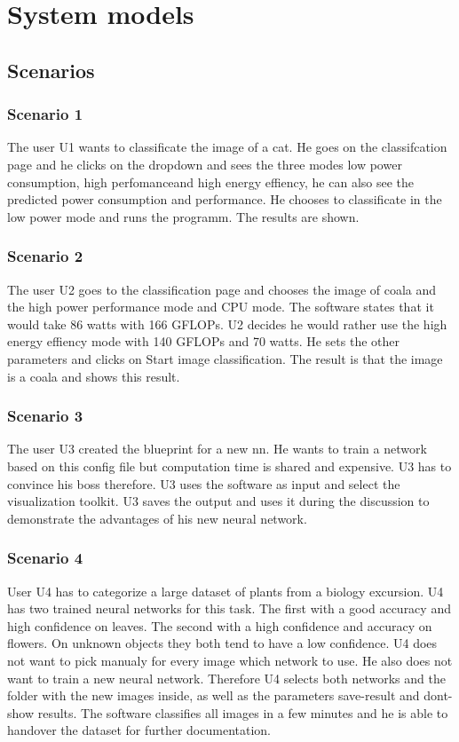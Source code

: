 \documentclass[parskip=full]{scrartcl}
\begin{document}
\section{System models}
\subsection{Scenarios}
\subsubsection{Scenario 1}
The user U1 wants to classificate the image of a cat. He goes on the classifcation page and he clicks on the dropdown and sees the three modes \glqq low power consumption\grqq , \glqq high perfomance\grqq and \glqq high energy effiency\grqq , he can also see the predicted power consumption and performance. He chooses to classificate in the low power mode and runs the programm. The results are shown.
\subsubsection{Scenario 2}
The user U2 goes to the classification page and chooses the image of coala and the high power performance mode and CPU mode. The software states that it would take 86 watts with 166 GFLOPs. U2 decides he would rather use the high energy effiency mode with 140 GFLOPs and 70 watts. He sets the other parameters and clicks on Start image classification. The result is that the image is a coala and shows this result. 
\subsubsection{Scenario 3}
The user U3 created the blueprint for a new nn.
He wants to train a network based on this config file but computation time is shared and expensive. U3 has to convince his boss therefore.
U3 uses the software as input and select the visualization toolkit.
U3 saves the output and uses it during the discussion to demonstrate the advantages of his new neural network.
\clearpage
\subsubsection{Scenario 4}
User U4 has to categorize a large dataset of plants from a biology excursion. U4 has two trained neural networks for this task. The first with a good accuracy and high confidence on leaves. The second with a high confidence and accuracy on flowers. On unknown objects they both tend to have a low confidence. U4 does not want to pick manualy for every image which network to use. He also does not want to train a new neural network. Therefore U4 selects both networks and the folder with the new images inside, as well as the parameters save-result and dont-show results. The software classifies all images in a few minutes and he is able to handover the dataset for further documentation.
\end{document}

